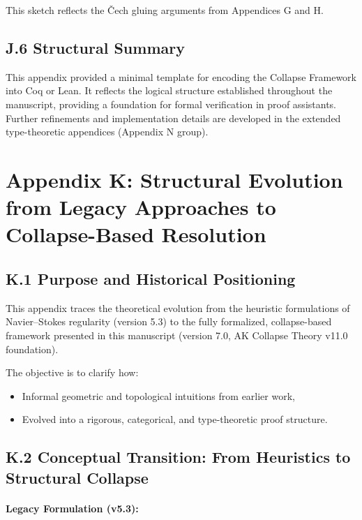 \documentclass[11pt]{article}
\begin{document}
This sketch reflects the Čech gluing arguments from Appendices G and H.

\subsection*{J.6 Structural Summary}

This appendix provided a minimal template for encoding the Collapse Framework into Coq or Lean.  
It reflects the logical structure established throughout the manuscript, providing a foundation for formal verification in proof assistants.  
Further refinements and implementation details are developed in the extended type-theoretic appendices (Appendix N group).



\section*{Appendix K: Structural Evolution from Legacy Approaches to Collapse-Based Resolution}

\subsection*{K.1 Purpose and Historical Positioning}

This appendix traces the theoretical evolution from the heuristic formulations of Navier–Stokes regularity (version 5.3) to the fully formalized, collapse-based framework presented in this manuscript (version 7.0, AK Collapse Theory v11.0 foundation).

The objective is to clarify how:

\begin{itemize}
  \item Informal geometric and topological intuitions from earlier work,
  \item Evolved into a rigorous, categorical, and type-theoretic proof structure.
\end{itemize}

\subsection*{K.2 Conceptual Transition: From Heuristics to Structural Collapse}

\paragraph{Legacy Formulation (v5.3):}
\end{document}
